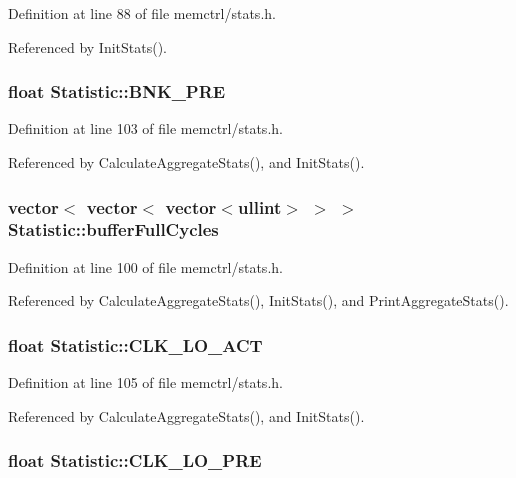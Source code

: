 Definition at line 88 of file memctrl/stats.h.

Referenced by InitStats().
\subsubsection[{BNK\_\-PRE}]{\setlength{\rightskip}{0pt plus 5cm}float {\bf Statistic::BNK\_\-PRE}}\label{classStatistic_1d147f403924c8aeff6a094fee94a18e}




Definition at line 103 of file memctrl/stats.h.

Referenced by CalculateAggregateStats(), and InitStats().
\subsubsection[{bufferFullCycles}]{\setlength{\rightskip}{0pt plus 5cm}vector$<$ vector$<$ vector$<${\bf ullint}$>$ $>$ $>$ {\bf Statistic::bufferFullCycles}}\label{classStatistic_41c7deeccf71eff1695001914d361cfe}




Definition at line 100 of file memctrl/stats.h.

Referenced by CalculateAggregateStats(), InitStats(), and PrintAggregateStats().
\subsubsection[{CLK\_\-LO\_\-ACT}]{\setlength{\rightskip}{0pt plus 5cm}float {\bf Statistic::CLK\_\-LO\_\-ACT}}\label{classStatistic_03a0518557777eeca60a17d8117ded69}




Definition at line 105 of file memctrl/stats.h.

Referenced by CalculateAggregateStats(), and InitStats().
\subsubsection[{CLK\_\-LO\_\-PRE}]{\setlength{\rightskip}{0pt plus 5cm}float {\bf Statistic::CLK\_\-LO\_\-PRE}}\label{classStatistic_4b47a62ca90ee178f4e88e88d01c3dd0}




